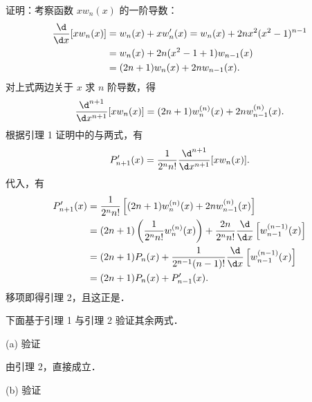 \begin{myproof}
    证明：考察函数 $x w_n(x)$ 的一阶导数：
    \begin{equation}\label{eq:lemma2-step1}
        \begin{aligned}
            \frac{\d}{\d x} [ x w_n(x) ] & = w_n(x) + x w_n'(x) = w_n(x) + 2n x^2 (x^2 - 1)^{n-1} \\
                                         & = w_n(x) + 2n(x^2 - 1 + 1) w_{n-1}(x)                  \\
                                         & = (2n+1) w_n(x) + 2n w_{n-1}(x).
        \end{aligned}
    \end{equation}
    对上式两边关于 $x$ 求 $n$ 阶导数，得
    \begin{equation}\label{eq:lemma2-step2}
        \frac{\d^{n+1}}{\d x^{n+1}} [ x w_n(x) ] = (2n+1) w_n^{(n)}(x) + 2n w_{n-1}^{(n)}(x).
    \end{equation}
    根据引理 1 证明中的与两式，有
    \begin{equation}\label{eq:lemma2-step3}
        P'_{n+1}(x) = \frac{1}{2^n n!} \frac{\d^{n+1}}{\d x^{n+1}} [ x w_n(x) ].
    \end{equation}
    代入，有
    \begin{equation}\label{eq:lemma2-step4}
        \begin{aligned}
            P'_{n+1}(x) & = \frac{1}{2^n n!} \left[ (2n+1) w_n^{(n)}(x) + 2n w_{n-1}^{(n)}(x) \right]                                                 \\
                        & = (2n+1) \left( \frac{1}{2^n n!} w_n^{(n)}(x) \right) + \frac{2n}{2^n n!} \frac{\d}{\d x} \left[ w_{n-1}^{(n-1)}(x) \right] \\
                        & = (2n+1) P_n(x) + \frac{1}{2^{n-1} (n-1)!} \frac{\d}{\d x} \left[ w_{n-1}^{(n-1)}(x) \right]                                \\
                        & = (2n+1) P_n(x) + P'_{n-1}(x).
        \end{aligned}
    \end{equation}
    移项即得引理 2，且这正是．

    下面基于引理 1 与引理 2 验证其余两式．

    (a) 验证

    由引理 2，直接成立．

    (b) 验证


\end{myproof}
